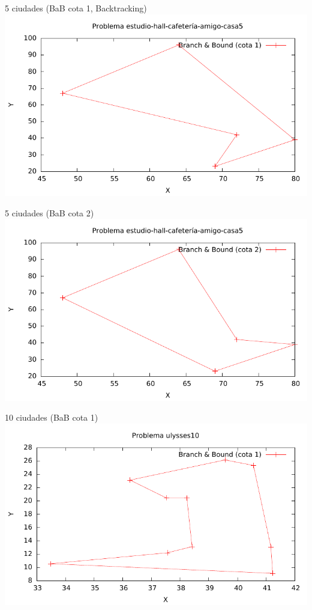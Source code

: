 \begin{frame}{5 ciudades (BaB cota 1, Backtracking)}
	\includegraphics[width=\textwidth]{img/e-h-c-a-c5_tsp_1}
\end{frame}

\begin{frame}{5 ciudades (BaB cota 2)}
	\includegraphics[width=\textwidth]{img/e-h-c-a-c5_tsp_2}
\end{frame}

\begin{frame}{10 ciudades (BaB cota 1)}
	\includegraphics[width=\textwidth]{img/ulysses10_tsp_1}
\end{frame}


